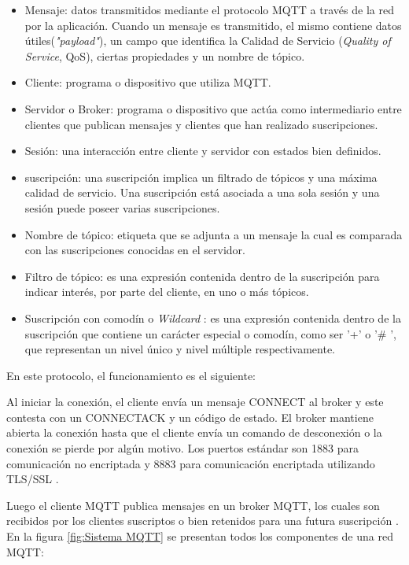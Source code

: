 \begin{itemize}
\item Mensaje: datos transmitidos mediante el protocolo MQTT  a través de la red por la aplicación. Cuando un mensaje es transmitido, el mismo contiene datos útiles(\textit{"payload"}), un campo que identifica la Calidad de Servicio (\textit{Quality of Service}, QoS), ciertas propiedades y un nombre de tópico.
\item Cliente: programa o dispositivo que utiliza MQTT.
\item Servidor o Broker: programa o dispositivo que actúa como intermediario entre clientes que publican mensajes y clientes que han realizado suscripciones.
\item Sesión: una interacción entre cliente y servidor con estados bien definidos.
\item suscripción: una  suscripción implica un filtrado de tópicos y una máxima calidad de servicio. Una suscripción está asociada a una sola sesión y una sesión puede poseer varias suscripciones.
\item Nombre de tópico: etiqueta que se adjunta a un mensaje la cual es comparada con las suscripciones conocidas en el servidor.
\item Filtro de tópico: es una expresión contenida dentro de la suscripción para indicar interés, por parte del cliente, en uno o más tópicos.
\item Suscripción con comodín o \textit{Wildcard} : es una expresión contenida dentro de la suscripción que contiene un carácter especial o comodín, como ser '+' o '\# ', que representan un nivel único y nivel múltiple respectivamente.

\end{itemize}

En este protocolo, el funcionamiento es el siguiente: 

Al iniciar la conexión, el cliente envía un mensaje CONNECT al broker y este contesta con un CONNECTACK y un código de estado. El broker mantiene abierta la conexión hasta que el cliente envía un comando de desconexión o la conexión se pierde por algún motivo. Los puertos estándar son 1883 para comunicación no encriptada y 8883 para comunicación encriptada utilizando TLS/SSL \citep{ARTICLE:4}.

Luego el cliente MQTT publica mensajes en un broker MQTT, los cuales son recibidos por los clientes suscriptos o bien retenidos para una futura suscripción \citep{WEBSITE:5}. En la figura \ref{fig:Sistema MQTT} se presentan todos los componentes de una red MQTT:  


